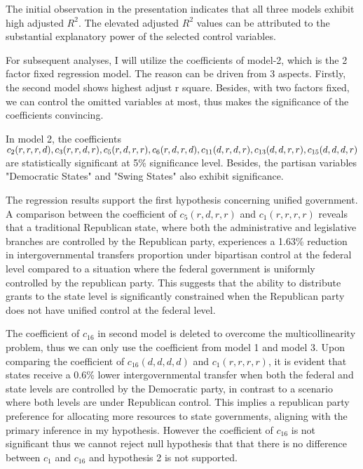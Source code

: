 The initial observation in the presentation indicates that all three models exhibit high adjusted $R^2$. The elevated adjusted $R^2$ values can be attributed to the substantial explanatory power of the selected control variables.

For subsequent analyses, I will utilize the coefficients of model-2, which is the 2 factor fixed regression model. The reason can be driven from 3 aspects. Firstly, the second model shows highest adjust r square. Besides, with two factors fixed, we can control the omitted variables at most, thus makes the significance of the coefficients convincing.


In model 2, the coefficients $c_2(r, r, r, d), c_3(r, r, d, r), c_5(r, d, r, r),c_6(r, d, r, d), c_{11}(d, r, d, r),\\ c_{13}(d, d, r, r), c_{15}(d, d, d, r)$ are statistically significant at 5\% significance level. Besides, the partisan variables "Democratic States" and "Swing States" also exhibit significance.

The regression results support the first hypothesis concerning unified government. A comparison between the coefficient of $c_5(r, d, r, r)$ and $c_1(r, r, r, r)$ reveals that a traditional Republican state, where both the administrative and legislative branches are controlled by the Republican party, experiences a 1.63\% reduction in intergovernmental transfers proportion under bipartisan control at the federal level compared to a situation where the federal government is uniformly controlled by the republican party. This suggests that the ability to distribute grants to the state level is significantly constrained when the Republican party does not have unified control at the federal level.


The coefficient of $c_{16}$ in second model is deleted to overcome the multicollinearity problem, thus we can only use the coefficient from model 1 and model 3.  Upon comparing the coefficient of $c_{16}(d, d, d, d)$ and $c_1(r, r, r, r)$, it is evident that states receive a 0.6\% lower intergovernmental transfer when both the federal and state levels are controlled by the Democratic party, in contrast to a scenario where both levels are under Republican control. This implies a republican party preference for allocating more resources to state governments, aligning with the primary inference in my hypothesis. However the coefficient of $c_{16}$ is not significant thus we cannot reject null hypothesis that that there is no difference between $c_1$ and $c_{16}$ and hypothesis 2 is not supported.

